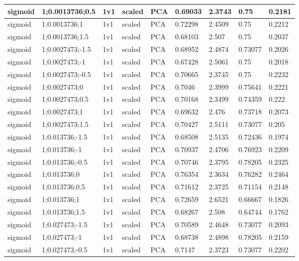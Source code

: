 \begin{longtable}{lllllllll}
sigmoid & 1;0.0013736;0.5 & 1v1 & scaled & PCA & 0.69033 & 2.3743 & 0.75 & 0.2181\\ \hline
sigmoid & 1;0.0013736;1 & 1v1 & scaled & PCA & 0.72298 & 2.4509 & 0.75 & 0.2212\\ \hline
sigmoid & 1;0.0013736;1.5 & 1v1 & scaled & PCA & 0.68103 & 2.507 & 0.75 & 0.2037\\ \hline
sigmoid & 1;0.0027473;-1.5 & 1v1 & scaled & PCA & 0.68952 & 2.4874 & 0.73077 & 0.2026\\ \hline
sigmoid & 1;0.0027473;-1 & 1v1 & scaled & PCA & 0.67428 & 2.5061 & 0.75 & 0.2018\\ \hline
sigmoid & 1;0.0027473;-0.5 & 1v1 & scaled & PCA & 0.70665 & 2.3745 & 0.75 & 0.2232\\ \hline
sigmoid & 1;0.0027473;0 & 1v1 & scaled & PCA & 0.7046 & 2.3999 & 0.75641 & 0.2221\\ \hline
sigmoid & 1;0.0027473;0.5 & 1v1 & scaled & PCA & 0.70168 & 2.3499 & 0.74359 & 0.222\\ \hline
sigmoid & 1;0.0027473;1 & 1v1 & scaled & PCA & 0.69632 & 2.476 & 0.73718 & 0.2073\\ \hline
sigmoid & 1;0.0027473;1.5 & 1v1 & scaled & PCA & 0.70427 & 2.5111 & 0.73077 & 0.205\\ \hline
sigmoid & 1;0.013736;-1.5 & 1v1 & scaled & PCA & 0.68508 & 2.5135 & 0.72436 & 0.1974\\ \hline
sigmoid & 1;0.013736;-1 & 1v1 & scaled & PCA & 0.70937 & 2.4706 & 0.76923 & 0.2209\\ \hline
sigmoid & 1;0.013736;-0.5 & 1v1 & scaled & PCA & 0.70746 & 2.3795 & 0.78205 & 0.2325\\ \hline
sigmoid & 1;0.013736;0 & 1v1 & scaled & PCA & 0.76354 & 2.3634 & 0.76282 & 0.2464\\ \hline
sigmoid & 1;0.013736;0.5 & 1v1 & scaled & PCA & 0.71612 & 2.3725 & 0.71154 & 0.2148\\ \hline
sigmoid & 1;0.013736;1 & 1v1 & scaled & PCA & 0.72659 & 2.6521 & 0.66667 & 0.1826\\ \hline
sigmoid & 1;0.013736;1.5 & 1v1 & scaled & PCA & 0.68267 & 2.508 & 0.64744 & 0.1762\\ \hline
sigmoid & 1;0.027473;-1.5 & 1v1 & scaled & PCA & 0.70589 & 2.4648 & 0.73077 & 0.2093\\ \hline
sigmoid & 1;0.027473;-1 & 1v1 & scaled & PCA & 0.68738 & 2.4898 & 0.78205 & 0.2159\\ \hline
sigmoid & 1;0.027473;-0.5 & 1v1 & scaled & PCA & 0.7147 & 2.3723 & 0.73077 & 0.2202\\ \hline

\end{longtable}
